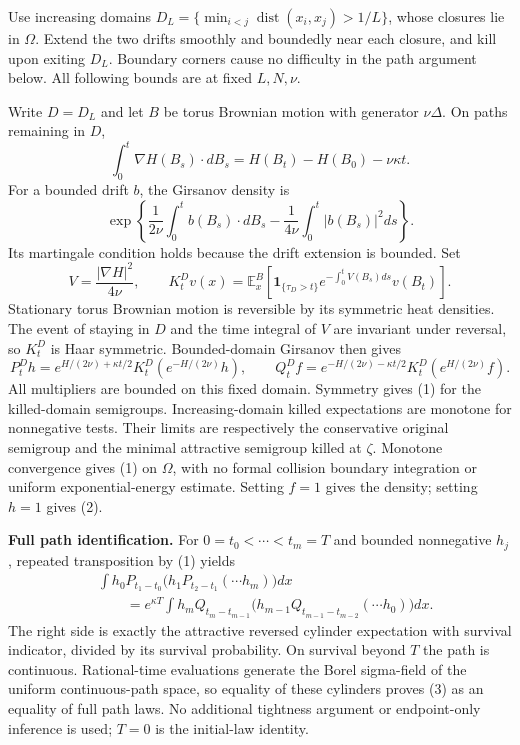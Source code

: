 \documentclass[11pt]{article}
\newcommand{\E}{\mathbb E}
\begin{document}
Use increasing domains $D_L=\{\min_{i<j}\operatorname{dist}(x_i,x_j)>1/L\}$, whose closures lie in $\Omega$. Extend the two drifts smoothly and boundedly near each closure, and kill upon exiting $D_L$. Boundary corners cause no difficulty in the path argument below. All following bounds are at fixed $L,N,\nu$.

Write $D=D_L$ and let $B$ be torus Brownian motion with generator $\nu\Delta$. On paths remaining in $D$,
\[
 \int_0^t\nabla H(B_s)\cdot dB_s=H(B_t)-H(B_0)-\nu\kappa t.
\]
For a bounded drift $b$, the Girsanov density is
\[
 \exp\left\{\frac1{2\nu}\int_0^t b(B_s)\cdot dB_s
                  -\frac1{4\nu}\int_0^t|b(B_s)|^2ds\right\}.
\]
Its martingale condition holds because the drift extension is bounded. Set
\[
 V=\frac{|\nabla H|^2}{4\nu},\qquad
 K_t^Dv(x)=\E_x^B\!\left[\mathbf1_{\{\tau_D>t\}}
             e^{-\int_0^tV(B_s)ds}v(B_t)\right].
\]
Stationary torus Brownian motion is reversible by its symmetric heat densities. The event of staying in $D$ and the time integral of $V$ are invariant under reversal, so $K_t^D$ is Haar symmetric. Bounded-domain Girsanov then gives
\[
 P_t^Dh=e^{H/(2\nu)+\kappa t/2}K_t^D(e^{-H/(2\nu)}h),\qquad
 Q_t^Df=e^{-H/(2\nu)-\kappa t/2}K_t^D(e^{H/(2\nu)}f).
\]
All multipliers are bounded on this fixed domain. Symmetry gives (1) for the killed-domain semigroups. Increasing-domain killed expectations are monotone for nonnegative tests. Their limits are respectively the conservative original semigroup and the minimal attractive semigroup killed at $\zeta$. Monotone convergence gives (1) on $\Omega$, with no formal collision boundary integration or uniform exponential-energy estimate. Setting $f=1$ gives the density; setting $h=1$ gives (2).

\newpage
\noindent\textbf{Full path identification.}
For $0=t_0<\cdots<t_m=T$ and bounded nonnegative $h_j$, repeated transposition by (1) yields
\[
 \begin{split}
 &\int h_0P_{t_1-t_0}\bigl(h_1P_{t_2-t_1}(\cdots h_m)\bigr)dx\\
 &\qquad=e^{\kappa T}\int h_mQ_{t_m-t_{m-1}}
                   \bigl(h_{m-1}Q_{t_{m-1}-t_{m-2}}(\cdots h_0)\bigr)dx.
 \end{split}
\]
The right side is exactly the attractive reversed cylinder expectation with survival indicator, divided by its survival probability. On survival beyond $T$ the path is continuous. Rational-time evaluations generate the Borel sigma-field of the uniform continuous-path space, so equality of these cylinders proves (3) as an equality of full path laws. No additional tightness argument or endpoint-only inference is used; $T=0$ is the initial-law identity.
\end{document}

